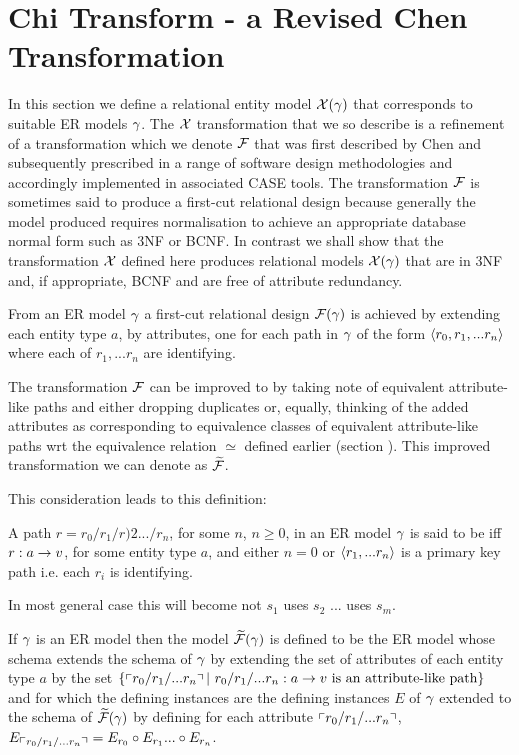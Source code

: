 \section{Chi Transform - a Revised Chen Transformation}
In this section we define a relational  entity model $\mathcal{X}(\gamma)$ that corresponds
to suitable ER models $\gamma$. The $\mathcal{X}$ transformation that we so describe is a refinement
of a transformation which we denote $\mathcal{F}$ that was first described by Chen and subsequently prescribed in a range of software design methodologies and accordingly implemented in associated CASE tools. The transformation $\mathcal{F}$ is sometimes said to produce a first-cut relational design because generally the model produced requires normalisation
to achieve an appropriate database normal form such as 3NF or BCNF. 
In contrast we shall show that the transformation $\mathcal{X}$ defined here produces relational models $\mathcal{X}(\gamma)$ that are in 3NF and, if appropriate, BCNF and are free of attribute redundancy.

From an ER model $\gamma$ a first-cut relational design $\mathcal{F}(\gamma)$ is achieved by extending each
entity type $a$, by attributes,  one for each path in $\gamma$ of the 
form $\langle r_0,r_1,...r_n\rangle$ where each of $r_1,...r_n$ are identifying. 

The transformation $\mathcal{F}$ can be improved to by taking note of equivalent attribute-like paths and
either dropping duplicates or, equally, thinking of the added attributes as corresponding to equivalence classes of 
equivalent attribute-like paths wrt the equivalence relation $\simeq$ defined earlier (section ). This improved transformation we can denote as $\mathcal{\widetilde{F}}$.

This consideration leads  to this definition:
\begin{definition}
A path $r=r_0/r_1/r)2.../r_n$, for some $n$, $n \geq 0$, in an ER model $\gamma$ is 
said to be  iff $r: a \rightarrow v$, for some entity type $a$,
and either $n=0$ or $\langle r_1,...r_n\rangle$ is a primary key path i.e. each $r_i$ is identifying.
\end{definition}
\begin{noteforfuture}
In most general case this will become not $s_1$ uses $s_2$ ... uses $s_m$.
\end{noteforfuture}
If $\gamma$ is an ER model then the model $\mathcal{\widetilde{F}}(\gamma)$ is defined to be the ER model whose schema extends the schema of $\gamma$
by extending the set of attributes of each entity type $a$ by the set 
$\set{\qq{r_0/r_1/...r_n}  | \ r_0/r_1/...r_n: a \morph \veee \mbox{ is an attribute-like path}}$ and for which the defining instances are the defining  instances $E$ of $\gamma$ extended to the schema of $\mathcal{\widetilde{F}}(\gamma)$ by defining for each attribute $\left\ulcorner r_0/r_1/...r_n\right\urcorner$, $E_{\left\ulcorner r_0/r_1/...r_n\right\urcorner} = E_{r_0} \circ E_{r_1}... \circ E_{r_n}$.

